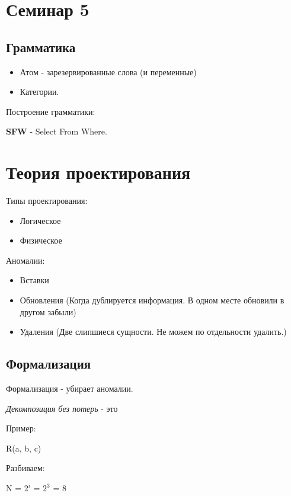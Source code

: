 \chapter{Семинар 5}


\section{Грамматика}

\begin{itemize}
	\item Атом - зарезервированные слова (и переменные)
	\item Категории.
\end{itemize}

Построение грамматики:

\textbf{SFW} - Select From Where.


\chapter{Теория проектирования }


Типы проектирования:

\begin{itemize}
	\item Логическое
	\item Физическое
\end{itemize}

Аномалии:

\begin{itemize}
	\item Вставки
	\item Обновления (Когда дублируется информация. В одном месте обновили в другом забыли)
	\item Удаления (Две слипшиеся сущности. Не можем по отдельности удалить.)
\end{itemize}


\section{Формализация}

Формализация - убирает аномалии.

\textit{Декомпозиция без потерь} - это

Пример:

R(a, b, c)

Разбиваем:

N = $2^i$ = $2^3$ = 8


